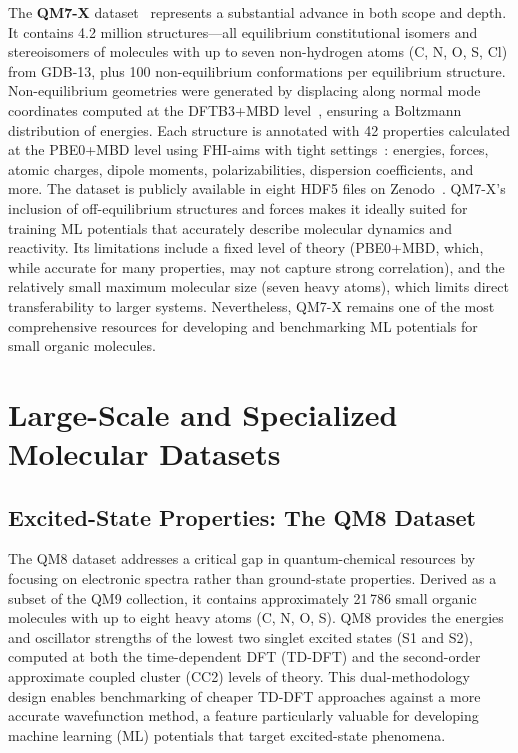 \documentclass[12pt]{article}
\begin{document}
The \textbf{QM7-X} dataset~\cite{ds6-33} represents a substantial advance in both scope and depth. It contains 4.2 million structures—all equilibrium constitutional isomers and stereoisomers of molecules with up to seven non-hydrogen atoms (C, N, O, S, Cl) from GDB-13, plus 100 non-equilibrium conformations per equilibrium structure. Non-equilibrium geometries were generated by displacing along normal mode coordinates computed at the DFTB3+MBD level~\cite{ds6-75,ds6-76}, ensuring a Boltzmann distribution of energies. Each structure is annotated with 42 properties calculated at the PBE0+MBD level using FHI-aims with tight settings~\cite{ds6-80}: energies, forces, atomic charges, dipole moments, polarizabilities, dispersion coefficients, and more. The dataset is publicly available in eight HDF5 files on Zenodo~\cite{ds6-81}. QM7-X's inclusion of off-equilibrium structures and forces makes it ideally suited for training ML potentials that accurately describe molecular dynamics and reactivity. Its limitations include a fixed level of theory (PBE0+MBD, which, while accurate for many properties, may not capture strong correlation), and the relatively small maximum molecular size (seven heavy atoms), which limits direct transferability to larger systems. Nevertheless, QM7-X remains one of the most comprehensive resources for developing and benchmarking ML potentials for small organic molecules.

\section{Large-Scale and Specialized Molecular Datasets}

\subsection{Excited-State Properties: The QM8 Dataset}

The QM8 dataset \cite{ds9-35} addresses a critical gap in quantum-chemical resources by focusing on electronic spectra rather than ground-state properties. Derived as a subset of the QM9 collection, it contains approximately 21\,786 small organic molecules with up to eight heavy atoms (C, N, O, S). QM8 provides the energies and oscillator strengths of the lowest two singlet excited states (S1 and S2), computed at both the time-dependent DFT (TD-DFT) and the second-order approximate coupled cluster (CC2) levels of theory. This dual-methodology design enables benchmarking of cheaper TD-DFT approaches against a more accurate wavefunction method, a feature particularly valuable for developing machine learning (ML) potentials that target excited-state phenomena.
\end{document}
